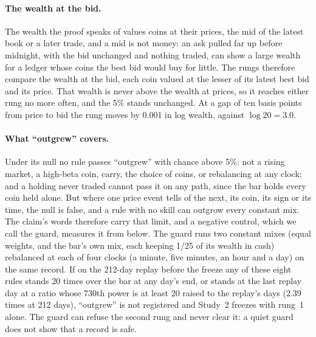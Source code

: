 \documentclass[11pt]{article}
\begin{document}
\paragraph{The wealth at the bid.} The wealth the proof speaks of values coins at their prices, the mid of the latest book or a later trade, and a mid is not money: an ask pulled far up before midnight, with the bid unchanged and nothing traded, can show a large wealth for a ledger whose coins the best bid would buy for little. The rungs therefore compare the wealth at the bid, each coin valued at the lesser of its latest best bid and its price. That wealth is never above the wealth at prices, so it reaches either rung no more often, and the 5\% stands unchanged. At a gap of ten basis points from price to bid the rung moves by 0.001 in log wealth, against $\log20=3.0$.

\paragraph{What ``outgrew'' covers.} Under its null no rule passes ``outgrew'' with chance above 5\%: not a rising market, a high-beta coin, carry, the choice of coins, or rebalancing at any clock; and a holding never traded cannot pass it on any path, since the bar holds every coin held alone. But where one price event tells of the next, its coin, its sign or its time, the null is false, and a rule with no skill can outgrow every constant mix. The claim's words therefore carry that limit, and a negative control, which we call the guard, measures it from below. The guard runs two constant mixes (equal weights, and the bar's own mix, each keeping 1/25 of its wealth in cash) rebalanced at each of four clocks (a minute, five minutes, an hour and a day) on the same record. If on the 212-day replay before the freeze any of these eight rules stands 20 times over the bar at any day's end, or stands at the last replay day at a ratio whose 730th power is at least 20 raised to the replay's days (2.39 times at 212 days), ``outgrew'' is not registered and Study~2 freezes with rung~1 alone. The guard can refuse the second rung and never clear it: a quiet guard does not show that a record is safe.
\end{document}

